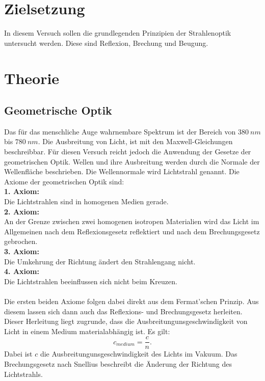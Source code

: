 \section{Zielsetzung}
\label{sec:Zielsetzung}
In diesem Versuch sollen die grundlegenden Prinzipien der Strahlenoptik untersucht werden. Diese sind Reflexion, Brechung und Beugung.

\section{Theorie}
\label{sec:Theorie}
\subsection{Geometrische Optik}
Das für das menschliche Auge wahrnembare Spektrum ist der Bereich von $\SI{380}{nm}$ bis $\SI{780}{nm}$. Die Ausbreitung von Licht, ist mit den Maxwell-Gleichungen
beschreibbar. Für diesen Versuch reicht jedoch die Anwendung der Gesetze der geometrischen Optik. Wellen und ihre Ausbreitung werden durch die Normale der Wellenfläche beschrieben.
Die Wellennormale wird Lichtstrahl genannt. Die Axiome der geometrischen Optik sind:\\
\textbf{1. Axiom:}\\
Die Lichtstrahlen sind in homogenen Medien gerade.\\
\textbf{2. Axiom:}\\
An der Grenze zwischen zwei homogenen isotropen Materialien wird das Licht im Allgemeinen nach dem Reflexionsgesetz reflektiert und nach dem Brechungsgesetz gebrochen.\\
\textbf{3. Axiom:}\\
Die Umkehrung der Richtung ändert den Strahlengang nicht.\\
\textbf{4. Axiom:}\\
Die Lichtstrahlen beeinflussen sich nicht beim Kreuzen.\\
\\
Die ersten beiden Axiome folgen dabei direkt aus dem Fermat'schen Prinzip. Aus diesem lassen sich dann auch das Reflexions- und Brechungsgesetz herleiten.\\
Dieser Herleitung liegt zugrunde, dass die Ausbreitungunsgeschwindigkeit von Licht in einem Medium materialabhängig ist. Es gilt:
\begin{equation*}
    c_{medium} = \frac{c}{n}.
\end{equation*}
Dabei ist $c$ die Ausbreitungunsgeschwindigkeit des Lichts im Vakuum. Das Brechungsgesetz nach Snellius beschreibt die Änderung der Richtung des Lichtstrahls.
